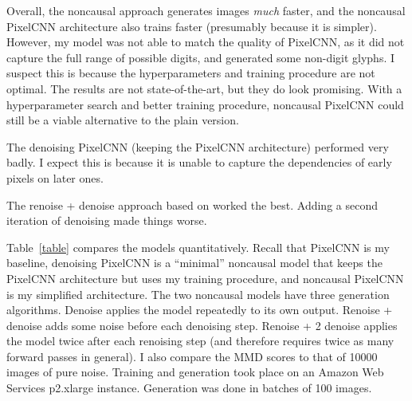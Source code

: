 \documentclass[11pt, a4paper, openany]{book}
\newcommand{\nquote}[1]{``{#1}''}
\begin{document}
Overall, the noncausal approach generates images \emph{much} faster, and the noncausal PixelCNN architecture also trains faster (presumably because it is simpler). However, my model was not able to match the quality of PixelCNN, as it did not capture the full range of possible digits, and generated some non-digit glyphs. I suspect this is because the hyperparameters and training procedure are not optimal. The results are not state-of-the-art, but they do look promising. With a hyperparameter search and better training procedure, noncausal PixelCNN could still be a viable alternative to the plain version.

The denoising PixelCNN (keeping the PixelCNN architecture) performed very badly. I expect this is because it is unable to capture the dependencies of early pixels on later ones.

The renoise + denoise approach based on \citet{gsnnade} worked the best. Adding a second iteration of denoising made things worse.

Table~\ref{table} compares the models quantitatively. Recall that PixelCNN is my baseline, denoising PixelCNN is a \nquote{minimal} noncausal model that keeps the PixelCNN architecture but uses my training procedure, and noncausal PixelCNN is my simplified architecture. The two noncausal models have three generation algorithms. Denoise applies the model repeatedly to its own output. Renoise + denoise adds some noise before each denoising step. Renoise + 2 denoise applies the model twice after each renoising step (and therefore requires twice as many forward passes in general). I also compare the MMD scores to that of 10000 images of pure noise. Training and generation took place on an Amazon Web Services p2.xlarge instance. Generation was done in batches of 100 images.
\end{document}
